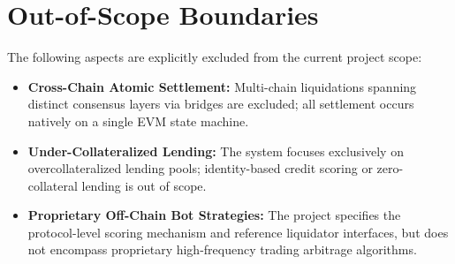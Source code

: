 \section{Out-of-Scope Boundaries}
The following aspects are explicitly excluded from the current project scope:
\begin{itemize}
    \item \textbf{Cross-Chain Atomic Settlement:} Multi-chain liquidations spanning distinct consensus layers via bridges are excluded; all settlement occurs natively on a single EVM state machine.
    \item \textbf{Under-Collateralized Lending:} The system focuses exclusively on overcollateralized lending pools; identity-based credit scoring or zero-collateral lending is out of scope.
    \item \textbf{Proprietary Off-Chain Bot Strategies:} The project specifies the protocol-level scoring mechanism and reference liquidator interfaces, but does not encompass proprietary high-frequency trading arbitrage algorithms.
\end{itemize}

